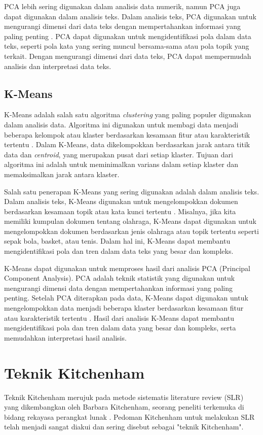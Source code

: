 PCA lebih sering digunakan dalam analisis data numerik, namun PCA juga dapat digunakan dalam analisis teks. Dalam analisis teks, PCA digunakan untuk mengurangi dimensi dari data teks dengan mempertahankan informasi yang paling penting \cite{beattie_exploration_2021}. PCA dapat digunakan untuk mengidentifikasi pola dalam data teks, seperti pola kata yang sering muncul bersama-sama atau pola topik yang terkait. Dengan mengurangi dimensi dari data teks, PCA dapat mempermudah analisis dan interpretasi data teks. 

\subsection{K-Means}
K-Means adalah salah satu algoritma \textit{clustering} yang paling populer digunakan dalam analisis data. Algoritma ini digunakan untuk membagi data menjadi beberapa kelompok atau klaster berdasarkan kesamaan fitur atau karakteristik tertentu \cite{jahwar2020meta}. Dalam K-Means, data dikelompokkan berdasarkan jarak antara titik data dan \textit{centroid}, yang merupakan pusat dari setiap klaster. Tujuan dari algoritma ini adalah untuk meminimalkan varians dalam setiap klaster dan memaksimalkan jarak antara klaster.

Salah satu penerapan K-Means yang sering digunakan adalah dalam analisis teks. Dalam analisis teks, K-Means digunakan untuk mengelompokkan dokumen berdasarkan kesamaan topik atau kata kunci tertentu \cite{ikotun_kmeans_2023}. Misalnya, jika kita memiliki kumpulan dokumen tentang olahraga, K-Means dapat digunakan untuk mengelompokkan dokumen berdasarkan jenis olahraga atau topik tertentu seperti sepak bola, basket, atau tenis. Dalam hal ini, K-Means dapat membantu mengidentifikasi pola dan tren dalam data teks yang besar dan kompleks.

K-Means dapat digunakan untuk memproses hasil dari analisis PCA (Principal Component Analysis). PCA adalah teknik statistik yang digunakan untuk mengurangi dimensi data dengan mempertahankan informasi yang paling penting. Setelah PCA diterapkan pada data, K-Means dapat digunakan untuk mengelompokkan data menjadi beberapa klaster berdasarkan kesamaan fitur atau karakteristik tertentu \cite{ikotun_kmeans_2023}. Hasil dari analisis K-Means dapat membantu mengidentifikasi pola dan tren dalam data yang besar dan kompleks, serta memudahkan interpretasi hasil analisis. 

\section{Teknik Kitchenham}
Teknik Kitchenham merujuk pada metode sistematis literature review (SLR) yang dikembangkan oleh Barbara Kitchenham, seorang peneliti terkemuka di bidang rekayasa perangkat lunak \cite{kitchenham_systematic_2009}. Pedoman Kitchenham untuk melakukan SLR telah menjadi sangat diakui dan sering disebut sebagai "teknik Kitchenham".

